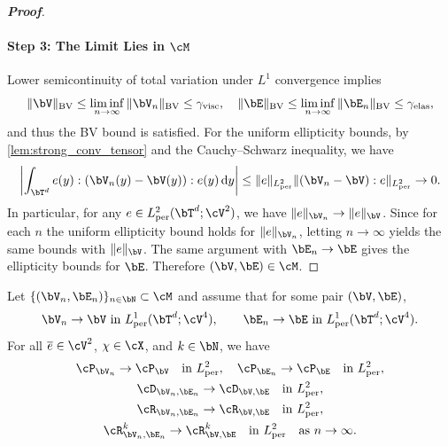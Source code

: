 \begin{proof}[\bf Proof]
\paragraph{Step 3: The Limit Lies in $\cM$}
Lower semicontinuity of total variation under $L^1$ convergence implies
\begin{equation*}
    \|\bV\|_{\mathrm{BV}}\le \liminf_{n\to\infty}\|\bV_n\|_{\mathrm{BV}}\leq \gamma_{\rm visc},
\quad
    \|\bE\|_{\mathrm{BV}}\le \liminf_{n\to\infty}\|\bE_n\|_{\mathrm{BV}}\leq \gamma_{\rm elas},
\end{equation*}
and thus the BV bound is satisfied. For the uniform ellipticity bounds, by \cref{lem:strong_conv_tensor} and the Cauchy--Schwarz inequality, we have
\begin{equation*}
    \left|\int_{\bT^d} e(y):(\bV_n(y)-\bV(y)):e(y)\,\mathrm{d}y\right| \le \|e\|_{L^2_{\mathrm{per}}}\|(\bV_n-\bV):e\|_{L^2_{\mathrm{per}}} \to 0.
\end{equation*}
In particular, for any $e\in L^2_{\mathrm{per}}(\bT^d;\cV^{2})$, we have $\|e\|_{\bV_n}\to \|e\|_{\bV}$. Since for each $n$ the uniform ellipticity bound holds for $\|e\|_{\bV_n}$, letting $n\to\infty$ yields the same bounds with $\|e\|_{\bV}$.
The same argument with $\bE_n\to\bE$ gives the ellipticity bounds for $\bE$. Therefore $(\bV,\bE)\in \cM$.
\end{proof}

\begin{proposition}\label{prop:strong_conv}
Let $\{(\bV_n,\bE_n)\}_{n\in\bN}\subset\cM$ and assume that for some pair $(\bV,\bE)$,
\begin{equation}\label{eq:micro_conv_L1}
\bV_n\to\bV \ \text{in }L^1_{\rm per}(\bT^d;\cV^4),\qquad
\bE_n\to\bE \ \text{in }L^1_{\rm per}(\bT^d;\cV^4).
\end{equation}
For all $\overline{e}\in\cV^{2}$, $\chi\in\cX$, and $k\in\bN$, we have
\begin{gather}
    \cP_{\bV_n} \to \cP_{\bV}\quad \text{in } L^2_{\rm per},\quad \cP_{\bE_n} \to \cP_{\bE}\quad \text{in } L^2_{\rm per}, \label{eq:P_conv}\\
    \cD_{\bV_n,\bE_n} \to \cD_{\bV,\bE}\quad \text{in } L^2_{\rm per}, \label{eq:D_conv}\\
    \cR_{\bV_n,\bE_n}\to\cR_{\bV,\bE}\quad \text{in } L^2_{\rm per}, \label{eq:R_conv}\\
    \cR^k_{\bV_n,\bE_n}\to\cR^k_{\bV,\bE}\quad \text{in } L^2_{\rm per}\quad \text{as }n\to\infty. \label{eq:R_k_conv}
\end{gather}
\end{proposition}

